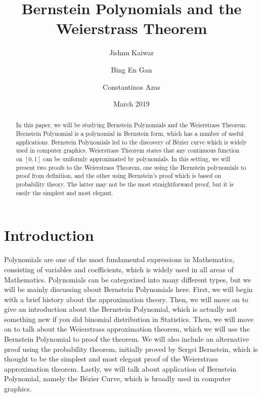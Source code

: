 \documentclass{article}
\title{Bernstein Polynomials and the Weierstrass Theorem}
\author{Jishnu Kaiwar
  \and
  Bing En Gan
  \and
  Constantinos Azas}
\date{March 2019}
\begin{document}
\maketitle

\begin{abstract}
    In this paper, we will be studying Bernstein Polynomials and the Weierstrass Theorem.
    Bernstein Polynomial is a polynomial in Bernstein form, which has a number of useful applications.
    Bernstein Polynomials led to the discovery of B\'ezier curve which is widely used in computer graphics.
    Weierstrass Theorem states that any continuous function on $[0,1]$ can be uniformly approximated by polynomials.
    In this setting, we will present two proofs to the Weierstrass Theorem, one using the Bernstein polynomials to proof from definition, and the other using Bernstein's proof which is based on probability theory.
    The latter may not be the most straightforward proof, but it is easily the simplest and most elegant.
\end{abstract}
\newpage
\tableofcontents 
\newpage
\section{Introduction}\label{sec:intro}
Polynomials are one of the most fundamental expressions in Mathematics, consisting of variables and coefficients, which is widely used in all areas of Mathematics. Polynomials can be categorized into many different types, but we will be mainly discussing about Bernstein Polynomials here. First, we will begin with a brief history about the approximation theory. Then, we will move on to give an introduction about the Bernstein Polynomial, which is actually not something new if you did binomial distribution in Statistics. Then, we will move on to talk about the Weierstrass approximation theorem, which we will use the Bernstein Polynomial to proof the theorem. We will also include an alternative proof using the probability theorem, initially proved by Sergei Bernstein, which is thought to be the simplest and most elegant proof of the Weierstrass approximation theorem. Lastly, we will talk about application of Bernstein Polynomial, namely the B\'ezier Curve, which is broadly used in computer graphics.
\end{document}
